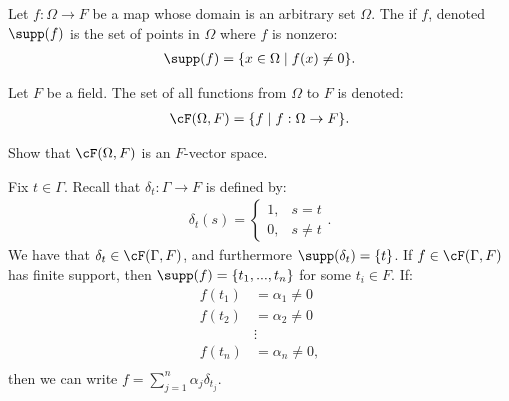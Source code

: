     \begin{definition}
        Let $f:\Omega \rightarrow F$ be a map whose domain is an arbitrary set $\Omega$. The  if $f$, denoted $\supp(f)$ is the set of points in $\Omega$ where $f$ is nonzero:
            \begin{equation*}
            \begin{split}
                \supp(f) = \{x \in \Omega \mid f(x) \neq 0\}.
            \end{split}
            \end{equation*}
    \end{definition}

    \begin{definition}
        Let $F$ be a field. The set of all functions from $\Omega$ to $F$ is denoted:
            \begin{equation*}
            \begin{split}
                \cF(\Omega,F) = \{f \mid f:\Omega \rightarrow F\}.
            \end{split}
            \end{equation*}
    \end{definition}

    \begin{exercise}
        Show that $\cF(\Omega,F)$ is an $F$-vector space.
    \end{exercise}

    \begin{example}
        Fix $t \in \Gamma$. Recall that $\delta_t:\Gamma \rightarrow F$ is defined by:
            \begin{equation*}
            \begin{split}
                \delta_t (s) = \begin{cases} 1, & s = t \\ 0, & s \neq t \end{cases}.
            \end{split}
            \end{equation*}
        We have that $\delta_t \in \cF(\Gamma,F)$, and furthermore $\supp(\delta_t) = \{t \}$. If $f \in \cF(\Gamma,F)$ has finite support, then $\supp(f) = \{t_1,...,t_n\}$ for some $t_i \in F$. If:
            \begin{equation*}
            \begin{split}
                f(t_1) &= \alpha_1 \neq 0 \\
                f(t_2) &= \alpha_2 \neq 0 \\
                &\vdots \\
                f(t_n) &= \alpha_n \neq 0, \\
            \end{split}
            \end{equation*}
        then we can write $f = \sum_{j = 1}^n \alpha_j \delta_{t_j}$.
    \end{example}

